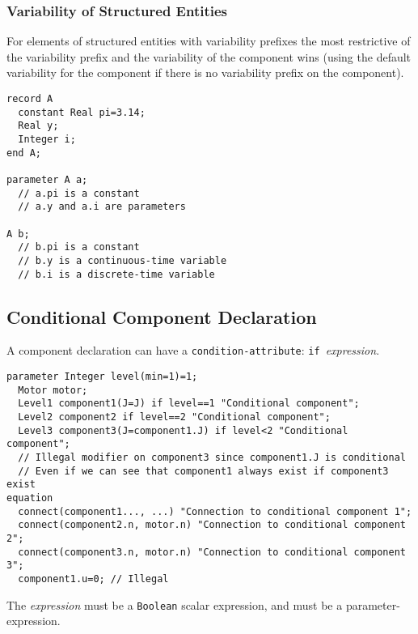 \subsubsection{Variability of Structured Entities}\label{variability-of-structured-entities}

For elements of structured entities with variability prefixes the most
restrictive of the variability prefix and the variability of the
component wins (using the default variability for the component if there
is no variability prefix on the component).

\begin{example}
\begin{lstlisting}[language=modelica]
record A
  constant Real pi=3.14;
  Real y;
  Integer i;
end A;

parameter A a;
  // a.pi is a constant
  // a.y and a.i are parameters

A b;
  // b.pi is a constant
  // b.y is a continuous-time variable
  // b.i is a discrete-time variable
\end{lstlisting}
\end{example}

\subsection{Conditional Component Declaration}\label{conditional-component-declaration}

A component declaration can have a \lstinline!condition-attribute!: \lstinline!if!~\emph{expression}.

\begin{example}
\begin{lstlisting}[language=modelica]
  parameter Integer level(min=1)=1;
  Motor motor;
  Level1 component1(J=J) if level==1 "Conditional component";
  Level2 component2 if level==2 "Conditional component";
  Level3 component3(J=component1.J) if level<2 "Conditional component";
  // Illegal modifier on component3 since component1.J is conditional
  // Even if we can see that component1 always exist if component3 exist
equation
  connect(component1..., ...) "Connection to conditional component 1";
  connect(component2.n, motor.n) "Connection to conditional component 2";
  connect(component3.n, motor.n) "Connection to conditional component 3";
  component1.u=0; // Illegal
\end{lstlisting}
\end{example}

The \emph{expression} must be a \lstinline!Boolean! scalar expression, and must be a
parameter-expression.

